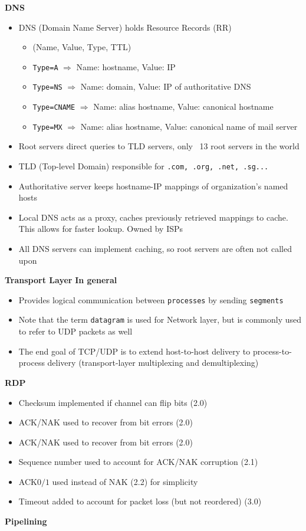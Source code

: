 \documentclass[a4paper]{article} \usepackage[backend=biber, style=numeric, sorting=none]{biblatex}
\begin{document}
\begin{multicols*}{4}
\textbf{DNS}
\begin{itemize}[leftmargin=*]
\item DNS (Domain Name Server) holds Resource Records (RR)
  \begin{itemize}[leftmargin=*]
  \item (Name, Value, Type, TTL)
  \item \texttt{Type=A} $\Rightarrow$ Name: hostname, Value: IP
  \item \texttt{Type=NS} $\Rightarrow$ Name: domain, Value: IP of authoritative DNS
  \item \texttt{Type=CNAME} $\Rightarrow$ Name: alias hostname, Value: canonical hostname
  \item \texttt{Type=MX} $\Rightarrow$ Name: alias hostname, Value: canonical name of mail server
  \end{itemize}
\item Root servers direct queries to TLD servers, only ~13 root servers in the world
\item TLD (Top-level Domain) responsible for \texttt{.com, .org, .net, .sg...}
\item Authoritative server keeps hostname-IP mappings of organization's named hosts
\item Local DNS acts as a proxy, caches previously retrieved mappings to cache. This allows for faster lookup. Owned by ISPs
\item All DNS servers can implement caching, so root servers are often not called upon
\end{itemize}

{\small\textbf{Transport Layer}}
\textbf{In general}
\begin{itemize}[leftmargin=*]
\item Provides logical communication between \texttt{processes} by sending \texttt{segments}
\item Note that the term \texttt{datagram} is used for Network layer, but is commonly used to refer to UDP packets as well
\item The end goal of TCP/UDP is to extend host-to-host delivery to process-to-process delivery (transport-layer multiplexing and demultiplexing)
\end{itemize}

\textbf{RDP}
\begin{itemize}[leftmargin=*]
  \item Checksum implemented if channel can flip bits (2.0)
  \item ACK/NAK used to recover from bit errors (2.0)
  \item ACK/NAK used to recover from bit errors (2.0)
  \item Sequence number used to account for ACK/NAK corruption (2.1)
  \item ACK$0/1$ used instead of NAK (2.2) for simplicity
  \item Timeout added to account for packet loss (but not reordered) (3.0)
\end{itemize}

\textbf{Pipelining}
\begin{itemize}[leftmargin=*]
\end{itemize}


    \end{multicols*}
\end{document}
